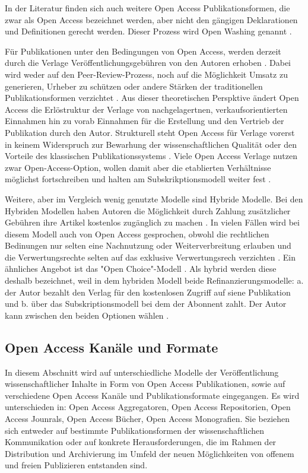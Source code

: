 In der Literatur \cite{suchen} finden sich auch weitere Open Access Publikationsformen, die zwar als Open Access bezeichnet werden, aber nicht den gängigen Deklarationen \cite{boai_2012} und Definitionen gerecht werden. Dieser Prozess wird Open Washing genannt \cite{suchen}. 

Für Publikationen unter den Bedingungen von Open Access, werden derzeit durch die Verlage Veröffentlichungsgebühren von den Autoren erhoben \cite{suchen}. Dabei wird weder auf den Peer-Review-Prozess, noch auf die Möglichkeit Umsatz zu generieren, Urheber zu schützen oder andere Stärken der traditionellen Publikationsformen verzichtet \cite{albert_2006_open_implications} \cite{Open_Access_net_2009}. Aus dieser theoretischen Perspktive ändert Open Access die Erlöstruktur der Verlage von nachgelagertnen, verkaufsorientierten Einnahmen hin zu vorab Einnahmen für die Erstellung und den Vertrieb der Publikation durch den Autor. Strukturell steht Open Access für Verlage vorerst in keinem Widerspruch zur Bewarhung der wissenschaftlichen Qualität oder den Vorteile des klassischen Publikationssystems \cite{Suber_2002}. Viele Open Access Verlage nutzen zwar Open-Access-Option, wollen damit aber die etablierten Verhältnisse möglichst fortschreiben und halten am Subskrikptionsmodell weiter fest \cite{schmidt_2007_goldenen}.

Weitere, aber im Vergleich wenig genutzte Modelle sind Hybride Modelle. Bei den Hybriden Modellen haben Autoren die Möglichkeit durch Zahlung zusätzlicher Gebühren ihre Artikel kostenlos zugänglich zu machen \cite{muller_2010_open}. In vielen Fällen wird bei diesem Modell auch von Open Access gesprochen, obwohl die rechtlichen Bedinungen nur selten eine Nachnutzung oder Weiterverbreitung erlauben und die Verwertungsrechte selten auf das exklusive Verwertungsrech verzichten \cite{muller_2010_open}. Ein ähnliches Angebot ist das "Open Choice"-Modell \cite{Hess_2006}. Als hybrid werden diese deshalb bezeichnet, weil in dem hybriden Modell beide Refinanzierungsmodelle: a. der Autor bezahlt den Verlag für den kostenlosen Zugriff auf siene Publikation und b. über das Subskriptionsmodell bei dem der Abonnent zahlt. Der Autor kann zwischen den beiden Optionen wählen \cite{muller_2010_open}.

\subsection{Open Access Kanäle und Formate}
In diesem Abschnitt wird auf unterschiedliche Modelle der Veröffentlichung wissenschaftlicher Inhalte in Form von Open Access Publikationen, sowie auf verschiedene Open Access Kanäle und Publikationsformate eingegangen. Es wird unterschieden in: Open Access Aggregatoren, Open Access Repositorien, Open Access Jounrals, Open Access Bücher, Open Access Monografien. Sie beziehen sich entweder auf bestimmte Publikationsformen der wissenschaftlichen Kommunikation oder auf konkrete Herausforderungen, die im Rahmen der Distribution und Archivierung im Umfeld der neuen Möglichkeiten von offenem und freien Publizieren entstanden sind. 

